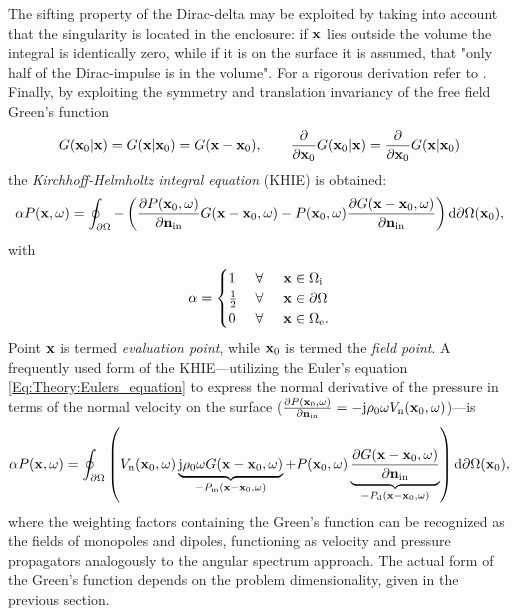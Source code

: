The sifting property of the Dirac-delta may be exploited by taking into account that the singularity is located in the enclosure:
if $\mathbf{x}$ lies outside the volume the integral is identically zero, while if it is on the surface it is assumed, that "only half of the Dirac-impulse is in the volume".
For a rigorous derivation refer to \cite{Williams1999}.
Finally, by exploiting the symmetry and translation invariancy of the free field Green's function
\begin{equation}
G(\mathbf{x}_0|\mathbf{x}) = G(\mathbf{x}|\mathbf{x}_0) = G(\mathbf{x}-\mathbf{x}_0), \qquad
\frac{\partial}{\partial \mathbf{x}_0} G(\mathbf{x}_0|\mathbf{x})= \frac{\partial}{\partial \mathbf{x}_0} G(\mathbf{x}|\mathbf{x}_0)
\end{equation}
the \emph{Kirchhoff-Helmholtz integral equation} (KHIE) is obtained:
\begin{equation}
\alpha P(\mathbf{x},\omega) = 
\oint_{\partial \Omega} - \left( 
\frac{\partial P(\mathbf{x}_0,\omega)}{\partial \mathbf{n}_{\mathrm{in}}} G(\mathbf{x}-\mathbf{x}_0,\omega)
-
P(\mathbf{x}_0,\omega)  \frac{\partial G(\mathbf{x}-\mathbf{x}_0,\omega)}{\partial\mathbf{n}_{\mathrm{in}}} 
\right)   \mathrm{d} \partial \Omega( \mathbf{x}_0),
\label{Eq:Theory:Kirchhoff-Helmholtz}
\end{equation}
with
\begin{equation*}
\alpha = \begin{cases} 
1           & \hspace{1mm} \forall \hspace{5mm}  \mathbf{x} \in \Omega_{\mathrm{i}}  	   \\
\frac{1}{2} & \hspace{1mm} \forall \hspace{5mm}  \mathbf{x} \in \partial \Omega  \\
0 			& \hspace{1mm} \forall \hspace{5mm}  \mathbf{x} \in \Omega_{\mathrm{e}}.
\end{cases}
\end{equation*}
Point $\mathbf{x}$ is termed \emph{evaluation point}, while $\mathbf{x}_0$ is termed the \emph{field point}. 
A frequently used form of the KHIE---utilizing the Euler's equation \eqref{Eq:Theory:Eulers_equation} to express the normal derivative of the pressure in terms of the normal velocity on the surface ($\frac{\partial P(\mathbf{x}_0,\omega)}{\partial \mathbf{n}_{\mathrm{in}}} = -\mathrm{j} \rho_0 \omega V_{\mathrm{n}}(\mathbf{x}_0,\omega)$)---is
\begin{equation}
\alpha P(\mathbf{x},\omega) = 
\oint_{\partial \Omega}  \left(  
V_{\mathrm{n}}(\mathbf{x}_0,\omega) \underbrace{\mathrm{j} \rho_0 \omega  G(\mathbf{x}-\mathbf{x}_0,\omega) }_{-P_{\mathrm{m}}(\mathbf{x}-\mathbf{x}_0,\omega)}
+
P(\mathbf{x}_0,\omega)  \underbrace{\frac{\partial G(\mathbf{x}-\mathbf{x}_0,\omega)}{\partial \mathbf{n}_{\mathrm{in}}}}_{-P_{\mathrm{d}}(\mathbf{x}-\mathbf{x}_0,\omega)}
\right)   \mathrm{d} \partial \Omega(\mathbf{x}_0),
\label{Eq:Theory:Kirchhoff}
\end{equation}
where the weighting factors containing the Green's function can be recognized as the fields of monopoles and dipoles, functioning as velocity and pressure propagators analogously to the angular spectrum approach.
The actual form of the Green's function depends on the problem dimensionality, given in the previous section.

